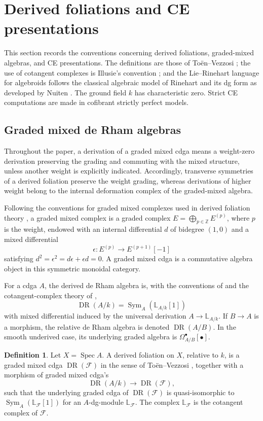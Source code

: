 \documentclass[11pt,reqno,a4paper,dvipsnames,x11names]{amsart}
\numberwithin{equation}{section}
\theoremstyle{plain}
\theoremstyle{definition}
\newtheorem{definition}[theorem]{Definition}
\theoremstyle{remark}
\DeclareMathOperator{\Spec}{Spec}
\DeclareMathOperator{\Sym}{Sym}
\DeclareMathOperator{\DR}{DR}
\newcommand{\kk}{k}
\newcommand{\cF}{\mathcal F}
\newcommand{\bbL}{\mathbb L}
\newcommand{\from}{\colon}
\begin{document}
\section{Derived foliations and CE presentations}

This section records the conventions concerning derived foliations, graded-mixed algebras, and CE presentations. The definitions are those of To\"en--Vezzosi \cite{TV}; the use of cotangent complexes is Illusie's convention \cite{IllusieI}; and the Lie--Rinehart language for algebroids follows the classical algebraic model of Rinehart and its dg form as developed by Nuiten \cite{Rinehart63,Nuiten}. The ground field \(\kk\) has characteristic zero. Strict CE computations are made in cofibrant strictly perfect models.

\subsection{Graded mixed de Rham algebras}

Throughout the paper, a derivation of a graded mixed cdga means a weight-zero derivation preserving the grading and commuting with the mixed structure, unless another weight is explicitly indicated. Accordingly, transverse symmetries of a derived foliation preserve the weight grading, whereas derivations of higher weight belong to the internal deformation complex of the graded-mixed algebra.

Following the conventions for graded mixed complexes used in derived foliation theory \cite[Section~1.2]{TV}, a graded mixed complex is a graded complex \(E=\bigoplus_{p\in\mathbb Z}E^{(p)}\), where \(p\) is the weight, endowed with an internal differential \(d\) of bidegree \((1,0)\) and a mixed differential
\[
 \epsilon\from E^{(p)}\longrightarrow E^{(p+1)}[-1]
\]
satisfying \(d^2=\epsilon^2=d\epsilon+\epsilon d=0\). A graded mixed cdga is a commutative algebra object in this symmetric monoidal category.

For a cdga \(A\), the derived de Rham algebra is, with the conventions of \cite[Section~1.4]{TV} and the cotangent-complex theory of \cite{IllusieI},
\[
 \DR(A/\kk)=\Sym_A(\bbL_{A/\kk}[1])
\]
with mixed differential induced by the universal derivation \(A\to\bbL_{A/\kk}\). If \(B\to A\) is a morphism, the relative de Rham algebra is denoted \(\DR(A/B)\). In the smooth underived case, its underlying graded algebra is \(\Omega^\bullet_{A/B}[\bullet]\).

\begin{definition}
Let \(X=\Spec A\). A derived foliation on \(X\), relative to \(\kk\), is a graded mixed cdga \(\DR(\cF)\) in the sense of To\"en--Vezzosi \cite[Definition~2.1.1.1]{TV}, together with a morphism of graded mixed cdga's
\[
 \DR(A/\kk)\longrightarrow \DR(\cF),
\]
such that the underlying graded cdga of \(\DR(\cF)\) is quasi-isomorphic to \(\Sym_A(\bbL_\cF[1])\) for an \(A\)-dg-module \(\bbL_\cF\). The complex \(\bbL_\cF\) is the cotangent complex of \(\cF\).
\end{definition}
\end{document}
